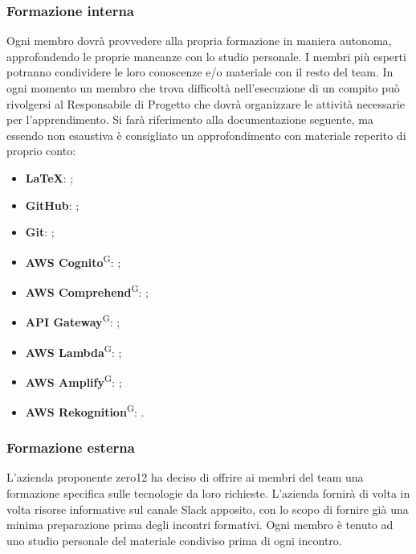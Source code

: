 \subsubsection{Formazione interna}
Ogni membro dovrà provvedere alla propria formazione in maniera autonoma, approfondendo le proprie mancanze con lo studio personale. I membri più esperti potranno condividere le loro conoscenze e/o materiale con il resto del team. In ogni momento un membro che trova difficoltà nell'esecuzione di un compito può rivolgersi al Responsabile di Progetto che dovrà organizzare le attività necessarie per l'apprendimento. Si farà riferimento alla documentazione seguente, ma essendo non esaustiva è consigliato un approfondimento con materiale reperito di proprio conto:
\begin{itemize}
\item \textbf{\LaTeX}: ;
\item \textbf{GitHub}: ;
\item \textbf{Git}: ;
\item \textbf{AWS Cognito}\textsuperscript{G}: ;
\item \textbf{AWS Comprehend}\textsuperscript{G}: ;
\item \textbf{API Gateway}\textsuperscript{G}: ;
\item \textbf{AWS Lambda}\textsuperscript{G}: ;
\item \textbf{AWS Amplify}\textsuperscript{G}: ;
\item \textbf{AWS Rekognition}\textsuperscript{G}: .
\end{itemize}

\subsubsection{Formazione esterna}
L'azienda proponente zero12 ha deciso di offrire ai membri del team una formazione specifica sulle tecnologie da loro richieste. L'azienda fornirà di volta in volta risorse informative sul canale Slack apposito, con lo scopo di fornire già una minima preparazione prima degli incontri formativi. Ogni membro è tenuto ad uno studio personale del materiale condiviso prima di ogni incontro.


